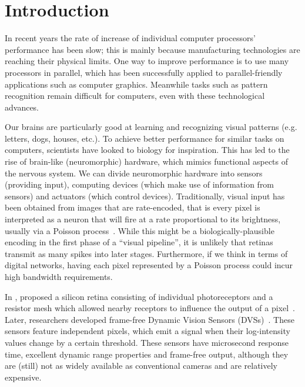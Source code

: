 \documentclass[conference]{IEEEtran}
\begin{document}
\section{Introduction}

In recent years the rate of increase of individual computer processors' performance has been slow; this is mainly because manufacturing technologies are reaching their physical limits. One way to improve performance is to use many processors in parallel, which has been successfully applied to parallel-friendly applications such as computer graphics. Meanwhile tasks such as pattern recognition remain difficult for computers, even with these technological advances.

Our brains are particularly good at learning and recognizing visual patterns (e.g. letters, dogs, houses, etc.). To achieve better performance for similar tasks on computers, scientists have looked to biology for inspiration. This has led to the rise of brain-like (neuromorphic) hardware, which mimics functional aspects of the nervous system. We can divide neuromorphic hardware into sensors (providing input), computing devices (which make use of information from sensors) and actuators (which control devices). Traditionally, visual input has been obtained from images that are rate-encoded, that is every pixel is interpreted as a neuron that will fire at a rate proportional to its brightness, usually via a Poisson process~\cite{snyder2012random}. While this might be a biologically-plausible encoding in the first phase of a ``visual pipeline'', it is unlikely that retinas transmit as many spikes into later stages. Furthermore, if we think in terms of digital networks, having each pixel represented by a Poisson process could incur high bandwidth requirements. 

In \citeyear{Mead1989}, \citeauthor{Mead1989} proposed a silicon retina consisting of individual photoreceptors and a resistor mesh which allowed nearby receptors to influence the output of a pixel~\cite{Mead1989}. 
Later, researchers developed frame-free Dynamic Vision Sensors (DVSs)~\cite{delbruckDVS,bernabeDVS}. These sensors feature independent pixels, which emit a signal when their log-intensity values change by a certain threshold.
These sensors have microsecond response time, excellent dynamic range properties and frame-free output, although they are (still) not as widely available as conventional cameras and are relatively expensive.
\end{document}
